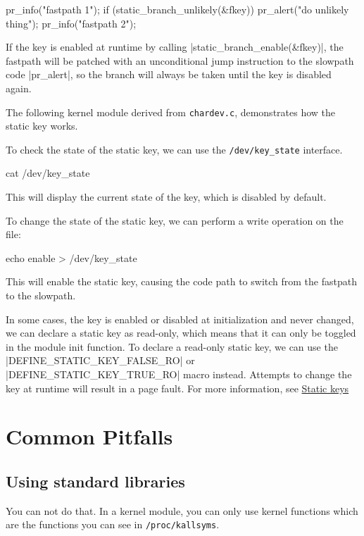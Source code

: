 \documentclass[10pt, oneside]{book}
\begin{document}
\begin{code}
pr_info("fastpath 1\n");
if (static_branch_unlikely(&fkey))
    pr_alert("do unlikely thing\n");
pr_info("fastpath 2\n");
\end{code}

If the key is enabled at runtime by calling \cpp|static_branch_enable(&fkey)|, the fastpath will be patched with an unconditional jump instruction to the slowpath code \cpp|pr_alert|, so the branch will always be taken until the key is disabled again.

The following kernel module derived from \verb|chardev.c|, demonstrates how the static key works.


To check the state of the static key, we can use the \verb|/dev/key_state| interface.

\begin{codebash}
cat /dev/key_state
\end{codebash}

This will display the current state of the key, which is disabled by default.

To change the state of the static key, we can perform a write operation on the file:

\begin{codebash}
echo enable > /dev/key_state
\end{codebash}

This will enable the static key, causing the code path to switch from the fastpath to the slowpath.

In some cases, the key is enabled or disabled at initialization and never changed, we can declare a static key as read-only, which means that it can only be toggled in the module init function. To declare a read-only static key, we can use the \cpp|DEFINE_STATIC_KEY_FALSE_RO| or \cpp|DEFINE_STATIC_KEY_TRUE_RO| macro instead. Attempts to change the key at runtime will result in a page fault.
For more information, see \href{https://www.kernel.org/doc/Documentation/static-keys.txt}{Static keys}

\section{Common Pitfalls}
\label{sec:opitfall}

\subsection{Using standard libraries}
\label{sec:using_stdlib}
You can not do that.
In a kernel module, you can only use kernel functions which are the functions you can see in \verb|/proc/kallsyms|.
\end{document}
